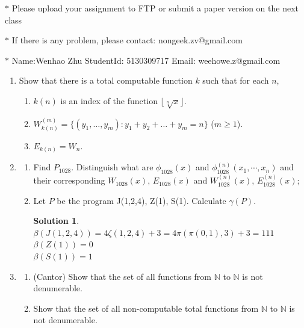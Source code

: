 \documentclass[12pt,a4paper]{article}
\theoremstyle{definition}
\newtheorem*{solution}{Solution}
\numberwithin{equation}{section}
\numberwithin{figure}{section}
\begin{document}
\noindent{}
\begin{center}
\footnotesize{\color{red}$*$ Please upload your assignment to FTP or submit a paper version on the next class}

\footnotesize{\color{red}$*$ If there is any problem, please contact: nongeek.zv@gmail.com }

\footnotesize{\color{blue}$*$ Name:Wenhao Zhu \quad StudentId: 5130309717 \quad Email: weehowe.z@gmail.com}
\end{center}


\begin{enumerate}%
  \item Show that there is a total computable function $k$ such that for each $n$,
    \begin{enumerate}
      \item $k(n)$ is an index of the function $\lfloor\sqrt[n]{x}\rfloor$.
      \item $W_{k(n)}^{(m)}=\{(y_{1},\ldots,y_{m}):y_{1}+y_{2}+\ldots+y_{m}=n\}$ ($m\geq 1$).
      \item $E_{k(n)}=W_n$.
    \end{enumerate}

  \item
  \begin{enumerate}
    \item Find $P_{1028}$. Distinguish what are $\phi_{1028}(x)$ and $\phi_{1028}^{(n)}(x_1,\cdots,x_n)$ and their corresponding $W_{1028}(x)$, $E_{1028}(x)$ and $W^{(n)}_{1028}(x)$, $E^{(n)}_{1028}(x)$;
    \item Let $P$ be the program J(1,2,4), Z(1), S(1). Calculate $\gamma(P)$.
    \begin{solution}
    $ \beta(J(1,2,4)) = 4\zeta(1,2,4) + 3 = 4\pi(\pi(0,1),3) + 3  = 111 $ \\
    $ \beta(Z(1)) = 0 $\\
    $ \beta(S(1)) = 1 $\\
    \end{solution}
  \end{enumerate}
\item

\begin{enumerate}
\item (Cantor) Show that the set of all functions from $\mathbb{N}$ to $\mathbb{N}$ is not denumerable.
\item Show that the set of all non-computable total functions from $\mathbb{N}$ to $\mathbb{N}$ is not denumerable.
\end{enumerate}


\end{enumerate}
\end{document}
